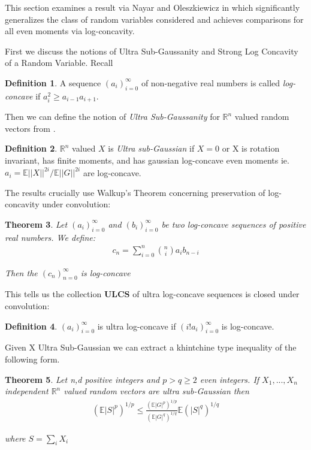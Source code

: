 \documentclass[10pt]{article}
\newcommand{\E}{\mathbb{E}}
\newcommand{\1}{\textbf{1}}
\newcommand{\R}{\mathbb{R}}
\newcommand{\norm}[1]{||#1||}
\newtheorem{theorem}{Theorem}
\theoremstyle{remark}
\theoremstyle{definition}
\newtheorem{defn}[theorem]{Definition}
\begin{document}
This section examines a result via Nayar and Oleszkiewicz in \cite{NO} which significantly generalizes the class of random variables considered and achieves comparisons for all even moments via log-concavity.

First we discuss the notions of Ultra Sub-Gaussanity and Strong Log Concavity of a Random Variable. Recall

\begin{defn}
	A sequence $(a_i)_{i=0}^{\infty}$ of non-negative real numbers is called \textit{log-concave} if $a_i^2 \geq a_{i-1}a_{i+1}$.
\end{defn}

Then we can define the notion of \textit{Ultra Sub-Gaussanity} for $\R^n$ valued random vectors from \cite{NO}.

\begin{defn}
	$\R^n$ valued $X$ is \textit{Ultra sub-Gaussian} if $X=0$ or X is rotation invariant, has finite moments, and has gaussian log-concave even moments ie. $a_i = \E \norm{X}^{2i}/\E \norm{G}^{2i}$ are log-concave.
\end{defn}

The results crucially use Walkup's Theorem concerning preservation of log-concavity under convolution:

\begin{theorem}
	Let $(a_i)_{i=0}^{\infty}$ and $(b_i)_{i=0}^{\infty}$ be two log-concave sequences of positive real numbers. We define:
	\begin{align*}
		c_n = \sum_{i=0}^n {n \choose i} a_i b_{n-i}
	\end{align*}

	Then the $(c_n)_{n=0}^{\infty}$ is log-concave
\end{theorem}

This tells us the collection $\textbf{ULCS}$ of ultra log-concave sequences is closed under convolution:

\begin{defn}
	$(a_i)_{i=0}^{\infty}$ is ultra log-concave if $(i! a_i)_{i=0}^{\infty}$ is log-concave.
\end{defn}

Given X Ultra Sub-Gaussian we can extract a khintchine type inequality of the following form.

\begin{theorem}
	Let n,d positive integers and $p > q \geq 2$ even integers. If $X_1,...,X_n$ independent $\R^n$ valued random vectors are ultra sub-Gaussian then
	\begin{align*}
		(\E |S|^p)^{1/p} \leq \frac{(\E|G|^p)^{1/p}}{(\E|G|^q)^{1/q}}\E (|S|^q)^{1/q}
	\end{align*}

	where $S = \sum_i X_i$
\end{theorem}
\end{document}
